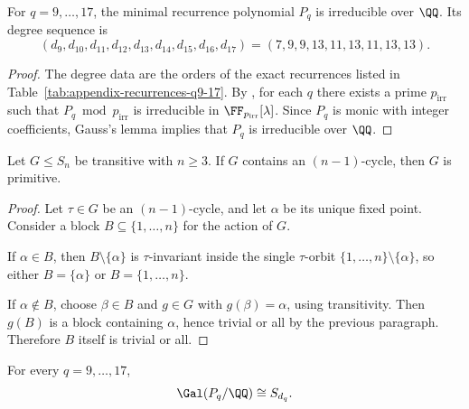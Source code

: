 \begin{proposition}
\label{prop:irreducibility-window}
For \(q=9,\dots,17\), the minimal recurrence polynomial \(P_q\) is irreducible
over \(\QQ\).  Its degree sequence is
\[
  (d_9,d_{10},d_{11},d_{12},d_{13},d_{14},d_{15},d_{16},d_{17})
  =(7,9,9,13,11,13,11,13,13).
\]
\end{proposition}

\begin{proof}
The degree data are the orders of the exact recurrences listed in
Table~\ref{tab:appendix-recurrences-q9-17}.  By
, for each \(q\) there exists a prime
\(p_{\mathrm{irr}}\) such that \(P_q\bmod p_{\mathrm{irr}}\) is irreducible in
\(\FF_{p_{\mathrm{irr}}}[\lambda]\).  Since \(P_q\) is monic with integer
coefficients, Gauss's lemma implies that \(P_q\) is irreducible over \(\QQ\).
\end{proof}

\begin{lemma}
\label{lem:nminus1-cycle-primitive}
Let \(G\le S_n\) be transitive with \(n\ge 3\).  If \(G\) contains an
\((n-1)\)-cycle, then \(G\) is primitive.
\end{lemma}

\begin{proof}
Let \(\tau\in G\) be an \((n-1)\)-cycle, and let \(\alpha\) be its unique fixed
point.  Consider a block \(B\subseteq\{1,\dots,n\}\) for the action of \(G\).

If \(\alpha\in B\), then \(B\setminus\{\alpha\}\) is \(\tau\)-invariant inside the
single \(\tau\)-orbit \(\{1,\dots,n\}\setminus\{\alpha\}\), so either
\(B=\{\alpha\}\) or \(B=\{1,\dots,n\}\).

If \(\alpha\notin B\), choose \(\beta\in B\) and \(g\in G\) with \(g(\beta)=\alpha\),
using transitivity.  Then \(g(B)\) is a block containing \(\alpha\), hence
trivial or all by the previous paragraph.  Therefore \(B\) itself is trivial or
all.
\end{proof}

\begin{theorem}
\label{thm:galois-sd-window}
For every \(q=9,\dots,17\),
\[
  \Gal(P_q/\QQ)\cong S_{d_q}.
\]
\end{theorem}

